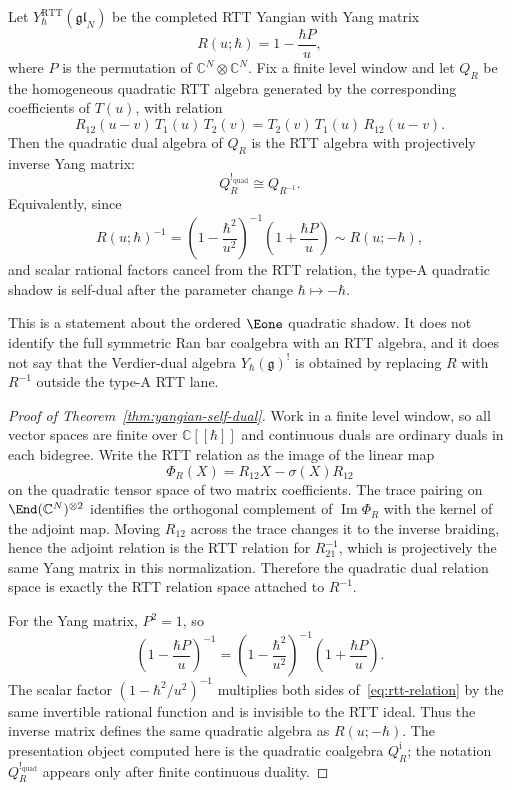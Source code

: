 \begin{theorem}\label{thm:yangian-self-dual}
Let $Y^{\mathrm{RTT}}_\hbar(\mathfrak{gl}_N)$ be the completed RTT
Yangian with Yang matrix
\[
R(u;\hbar)=1-\frac{\hbar P}{u},
\]
where $P$ is the permutation of $\mathbb C^N\otimes\mathbb C^N$. Fix a
finite level window and let $Q_R$ be the homogeneous quadratic RTT
algebra generated by the corresponding coefficients of $T(u)$, with
relation
\begin{equation}\label{eq:rtt-relation}
R_{12}(u-v)\,T_1(u)\,T_2(v)
=T_2(v)\,T_1(u)\,R_{12}(u-v).
\end{equation}
Then the quadratic dual algebra of $Q_R$ is the RTT algebra with
projectively inverse Yang matrix:
\[
Q_R^{!_{\mathrm{quad}}}\cong Q_{R^{-1}}.
\]
Equivalently, since
\[
R(u;\hbar)^{-1}
=\left(1-\frac{\hbar^2}{u^2}\right)^{-1}
\left(1+\frac{\hbar P}{u}\right)
\sim R(u;-\hbar),
\]
and scalar rational factors cancel from the RTT relation, the type-A
quadratic shadow is self-dual after the parameter change
$\hbar\mapsto-\hbar$.

This is a statement about the ordered $\Eone$ quadratic shadow. It does
not identify the full symmetric Ran bar coalgebra with an RTT algebra,
and it does not say that the Verdier-dual algebra $Y_\hbar(\mathfrak g)^!$
is obtained by replacing $R$ with $R^{-1}$ outside the type-A RTT lane.
\end{theorem}

\begin{proof}[Proof of Theorem~\ref{thm:yangian-self-dual}]
Work in a finite level window, so all vector spaces are finite over
$\mathbb C[[\hbar]]$ and continuous duals are ordinary duals in each
bidegree. Write the RTT relation as the image of the linear map
\[
\Phi_R(X)=R_{12}X-\sigma(X)R_{12}
\]
on the quadratic tensor space of two matrix coefficients. The trace
pairing on $\End(\mathbb C^N)^{\otimes 2}$ identifies the orthogonal
complement of $\operatorname{Im}\Phi_R$ with the kernel of the adjoint
map. Moving $R_{12}$ across the trace changes it to the inverse
braiding, hence the adjoint relation is the RTT relation for
$R^{-1}_{21}$, which is projectively the same Yang matrix in this
normalization. Therefore the quadratic dual relation space is exactly
the RTT relation space attached to $R^{-1}$.

For the Yang matrix, $P^2=1$, so
\[
\left(1-\frac{\hbar P}{u}\right)^{-1}
=\left(1-\frac{\hbar^2}{u^2}\right)^{-1}
\left(1+\frac{\hbar P}{u}\right).
\]
The scalar factor $\left(1-\hbar^2/u^2\right)^{-1}$ multiplies both
sides of~\eqref{eq:rtt-relation} by the same invertible rational
function and is invisible to the RTT ideal. Thus the inverse matrix
defines the same quadratic algebra as $R(u;-\hbar)$. The presentation
object computed here is the quadratic coalgebra $Q_R^{\mathrm i}$; the notation
$Q_R^{!_{\mathrm{quad}}}$ appears only after finite continuous duality.
\end{proof}

